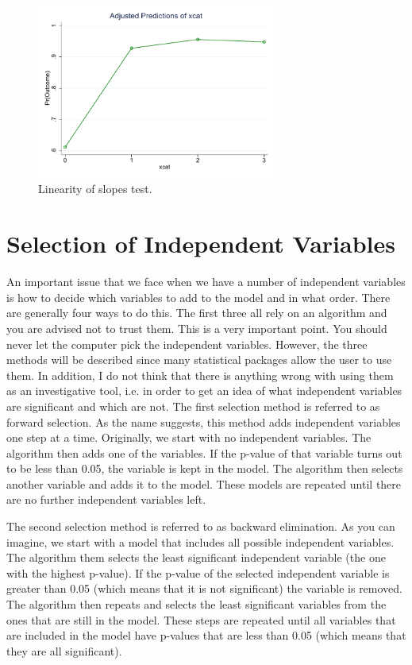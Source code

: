 \documentclass[a4paper,12pt,oneside]{book}
\begin{document}
\begin{stlog}\end{stlog}
\begin{figure}[h]
    \centering
    \includegraphics[width=0.7\textwidth]{book_3.pdf}
    \caption{Linearity of slopes test.}
    \label{fig:linearityofslopes}
\end{figure}
\section{Selection of Independent Variables}
An important issue that we face when we have a number of independent variables is how to decide which variables to add to the model and in what order. There are generally four ways to do this. 
The first three all rely on an algorithm and you are advised not to trust them. This is a very important point. You should never let the computer pick the independent variables. However, the three methods 
will be described since many statistical packages allow the user to use them. In addition, I do not think that there is anything wrong with using them as an investigative tool, i.e. in order to get an idea 
of what independent variables are significant and which are not. The first selection method is referred to as forward selection. As the name suggests, this method adds independent variables one step at a time. 
Originally, we start with no independent variables. The algorithm then adds one of the variables. If the p-value of that variable turns out to be less than 0.05, the variable is kept in the model. The algorithm 
then selects another variable and adds it to the model. These models are repeated until there are no further independent variables left.

The second selection method is referred to as backward elimination. As you can imagine, we start with a model that includes all possible independent variables. The algorithm them selects the least significant 
independent variable (the one with the highest p-value). If the p-value of the selected independent variable is greater than 0.05 (which means that it is not significant) the variable is removed. The algorithm 
then repeats and selects the least significant variables from the ones that are still in the model. These steps are repeated until all variables that are included in the model have p-values that are less than 0.05 
(which means that they are all significant).
\end{document}

